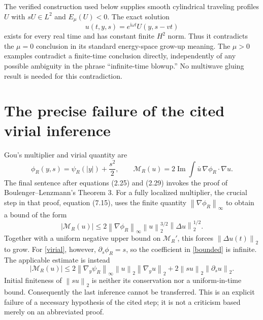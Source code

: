 \documentclass[11pt,a4paper]{article}
\newcommand{\ii}{\mathrm i}
\newcommand{\norm}[1]{\left\|#1\right\|}
\begin{document}
The verified construction used below supplies smooth cylindrical traveling profiles $U$ with $sU\in L^2$ and $E_\mu(U)<0$. The exact solution
\begin{equation}\label{traveler}
 u(t,y,s)=e^{\ii\omega t}U(y,s-vt)
\end{equation}
exists for every real time and has constant finite $H^2$ norm. Thus it contradicts the $\mu=0$ conclusion in its standard energy-space grow-up meaning. The $\mu>0$ examples contradict a finite-time conclusion directly, independently of any possible ambiguity in the phrase ``infinite-time blowup.'' No multiwave gluing result is needed for this contradiction.

\section{The precise failure of the cited virial inference}
Gou's multiplier and virial quantity are
\begin{equation}\label{virial}
 \phi_R(y,s)=\psi_R(|y|)+\frac{s^2}{2},\qquad
 \mathcal M_R(u)=2\operatorname{Im}\int\bar u\,\nabla\phi_R\cdot\nabla u.
\end{equation}
The final sentence after equations (2.25) and (2.29) invokes the proof of Boulenger--Lenzmann's Theorem 3. For a fully localized multiplier, the crucial step in that proof, equation (7.15), uses the finite quantity $\norm{\nabla\phi_R}_\infty$ to obtain a bound of the form
\begin{equation}\label{bounded}
 |\mathcal M_R(u)|\le 2\norm{\nabla\phi_R}_\infty
 \norm u_2^{3/2}\norm{\Delta u}_2^{1/2}.
\end{equation}
Together with a uniform negative upper bound on $\mathcal M_R'$, this forces $\norm{\Delta u(t)}_2$ to grow. For \eqref{virial}, however, $\partial_s\phi_R=s$, so the coefficient in \eqref{bounded} is infinite. The applicable estimate is instead
\begin{equation}\label{correct}
 |\mathcal M_R(u)|\le
 2\norm{\nabla_y\psi_R}_\infty\norm u_2\norm{\nabla_yu}_2
 +2\norm{su}_2\norm{\partial_su}_2.
\end{equation}
Initial finiteness of $\norm{su}_2$ is neither its conservation nor a uniform-in-time bound. Consequently the last inference cannot be transferred. This is an explicit failure of a necessary hypothesis of the cited step; it is not a criticism based merely on an abbreviated proof.
\end{document}
